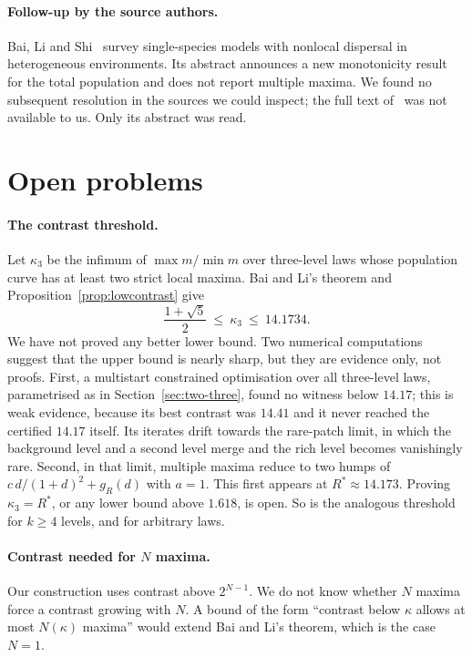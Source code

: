 \documentclass[11pt]{article}
\theoremstyle{remark}
\begin{document}
\paragraph{Follow-up by the source authors.}
Bai, Li and Shi~\cite{BaiLiShi2024} survey single-species models with
nonlocal dispersal in heterogeneous environments. Its abstract announces a
new monotonicity result for the total population and does not report
multiple maxima. We found no subsequent resolution in the sources we
could inspect; the full text of~\cite{BaiLiShi2024} was not available to
us. Only its abstract was read.

\section{Open problems}\label{sec:open}

\paragraph{The contrast threshold.}
Let \(\kappa_3\) be the infimum of \(\max m/\min m\) over three-level laws
whose population curve has at least two strict local maxima. Bai and Li's
theorem and Proposition~\ref{prop:lowcontrast} give
\[
 \frac{1+\sqrt5}2\ \le\ \kappa_3\ \le\ 14.1734 .
\]
We have not proved any better lower bound. Two numerical computations
suggest that the upper bound is nearly sharp, but they are evidence only,
not proofs. First, a multistart constrained optimisation over all
three-level laws, parametrised as in Section~\ref{sec:two-three}, found no
witness below \(14.17\); this is weak evidence, because its best contrast
was \(14.41\) and it never reached the certified \(14.17\) itself. Its
iterates drift towards the rare-patch limit,
in which the background level and a second level merge and the rich level
becomes vanishingly rare. Second, in that limit, multiple maxima reduce to
two humps of \(c\,d/(1+d)^2+g_R(d)\) with \(a=1\). This first appears at
\(R^*\approx14.173\). Proving \(\kappa_3=R^*\), or any lower bound above
\(1.618\), is open. So is the analogous threshold for \(k\ge4\) levels, and
for arbitrary laws.

\paragraph{Contrast needed for \(N\) maxima.}
Our construction uses contrast above \(2^{N-1}\). We do not know whether
\(N\) maxima force a contrast growing with \(N\). A bound of the form
``contrast below \(\kappa\) allows at most \(N(\kappa)\) maxima'' would
extend Bai and Li's theorem, which is the case \(N=1\).
\end{document}
